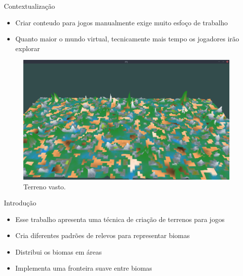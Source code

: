 \begin{frame}{Contextualização}
    \begin{itemize} \setlength\itemsep{1em}
        \item Criar conteudo para jogos manualmente exige muito esfoço de trabalho
        \item Quanto maior o mundo virtual, tecnicamente mais tempo os jogadores irão explorar \cite{fernando2009costas}
    \end{itemize}
    
    \begin{figure}[H]
        \centering
        \includegraphics[width=.5\textwidth]{img/re2bfb/fb/4b32.png}
        \caption{Terreno vasto.}
        \label{fig:img_re2bfb_fb_4b32Again}
    \end{figure}
    
\end{frame}

\begin{frame}{Introdução}
    \begin{itemize} \setlength\itemsep{1em}
        \item Esse trabalho apresenta uma técnica de criação de terrenos para jogos
        \item Cria diferentes padrões de relevos para representar biomas
        \item Distribui os biomas em áreas
        \item Implementa uma fronteira suave entre biomas
    \end{itemize}
    
\end{frame}